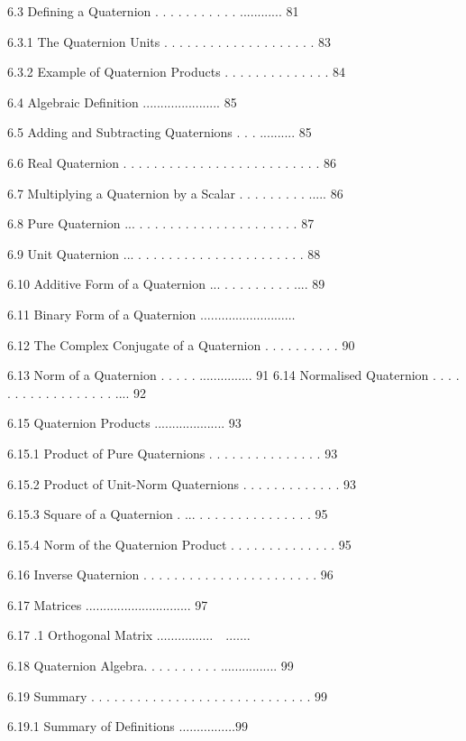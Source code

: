 \documentclass[10pt]{article}
\begin{document}
6.3 Defining a Quaternion . . . . . . . . . . . ............ 81

6.3.1 The Quaternion Units . . . . . . . . . . . . . . . . . . . . 83

6.3.2 Example of Quaternion Products . . . . . . . . . . . . . . 84

6.4 Algebraic Definition ...................... 85

6.5 Adding and Subtracting Quaternions . . . .......... 85

6.6 Real Quaternion . . . . . . . . . . . . . . . . . . . . . . . . . . 86

6.7 Multiplying a Quaternion by a Scalar . . . . . . . . . ..... 86

6.8 Pure Quaternion ... . . . . . . . . . . . . . . . . . . . . . 87

6.9 Unit Quaternion ... . . . . . . . . . . . . . . . . . . . . . . 88

6.10 Additive Form of a Quaternion ... . . . . . . . . . .... 89

6.11 Binary Form of a Quaternion $\ldots . \ldots \ldots \ldots . \ldots \ldots . \ldots \ldots$

6.12 The Complex Conjugate of a Quaternion . . . . . . . . . . 90

6.13 Norm of a Quaternion . . . . . ............... 91 6.14 Normalised Quaternion . . . . . . . . . . . . . . . . . . .... 92

6.15 Quaternion Products .................... 93

6.15.1 Product of Pure Quaternions . . . . . . . . . . . . . . . 93

6.15.2 Product of Unit-Norm Quaternions . . . . . . . . . . . . . 93

6.15.3 Square of a Quaternion . ... . . . . . . . . . . . . . . . 95

6.15.4 Norm of the Quaternion Product . . . . . . . . . . . . . . 95

6.16 Inverse Quaternion . . . . . . . . . . . . . . . . . . . . . . . 96

6.17 Matrices .............................. 97

6.17 .1 Orthogonal Matrix $\ldots \ldots \ldots . \ldots \ldots \quad . \ldots \ldots$

6.18 Quaternion Algebra. . . . . . . . . . ................ 99

6.19 Summary . . . . . . . . . . . . . . . . . . . . . . . . . . . . . 99

6.19.1 Summary of Definitions $\ldots \ldots \ldots . \ldots \ldots 99$
\end{document}

